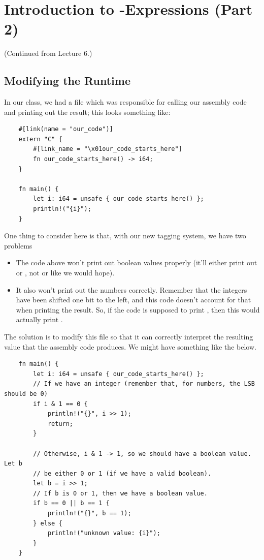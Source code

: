 \documentclass[letterpaper]{article}
\begin{document}
\section{Introduction to -Expressions (Part 2)}
(Continued from Lecture 6.)

\subsection{Modifying the Runtime}
In our class, we had a  file which was responsible for calling our assembly code and printing out the result; this looks something like:
\begin{verbatim}
    #[link(name = "our_code")]
    extern "C" {
        #[link_name = "\x01our_code_starts_here"]
        fn our_code_starts_here() -> i64;
    }
    
    fn main() {
        let i: i64 = unsafe { our_code_starts_here() };
        println!("{i}");
    }\end{verbatim}
One thing to consider here is that, with our new tagging system, we have two problems
\begin{itemize}
    \item The code above won't print out boolean values properly (it'll either print out  or , not  or  like we would hope).
    \item It also won't print out the numbers correctly. Remember that the integers have been shifted one bit to the left, and this code doesn't account for that when printing the result. So, if the code is supposed to print , then this would actually print . 
\end{itemize}
The solution is to modify this file so that it can correctly interpret the resulting value that the assembly code produces. We might have something like the below.
\begin{verbatim}
    fn main() {
        let i: i64 = unsafe { our_code_starts_here() };
        // If we have an integer (remember that, for numbers, the LSB should be 0)
        if i & 1 == 0 {
            println!("{}", i >> 1);
            return;
        }

        // Otherwise, i & 1 -> 1, so we should have a boolean value. Let b 
        // be either 0 or 1 (if we have a valid boolean).
        let b = i >> 1;
        // If b is 0 or 1, then we have a boolean value.
        if b == 0 || b == 1 {
            println!("{}", b == 1);
        } else {
            println!("unknown value: {i}");
        }
    }\end{verbatim}
\end{document}
